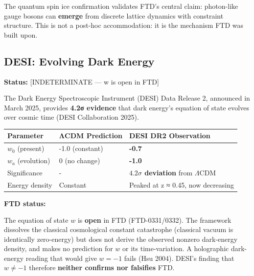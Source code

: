\documentclass[
  11pt,
  letterpaper,
  twoside,
  openany]{book}
\makeatletter
\let\orig@subsection\subsection
\renewcommand{\subsection}{\needspace{6\baselineskip}\orig@subsection}
\makeatother
\begin{document}
\begin{tcolorbox}[enhanced jigsaw, colbacktitle=quarto-callout-important-color!10!white, titlerule=0mm, bottomtitle=1mm, bottomrule=.15mm, colback=white, arc=.35mm, breakable, toprule=.15mm, title=\textcolor{quarto-callout-important-color}{\faExclamation}\hspace{0.5em}{Validation of Core Mechanism}, rightrule=.15mm, coltitle=black, leftrule=.75mm, colframe=quarto-callout-important-color-frame, toptitle=1mm, opacityback=0, opacitybacktitle=0.6, left=2mm]

The quantum spin ice confirmation validates FTD's central claim:
photon-like gauge bosons can \textbf{emerge} from discrete lattice
dynamics with constraint structure. This is not a post-hoc
accommodation: it is the mechanism FTD was built upon.

\end{tcolorbox}

\subsection{DESI: Evolving Dark Energy}\label{sec-desi-dark-energy}

\textbf{Status:} {[}INDETERMINATE --- w is open in FTD{]}

The Dark Energy Spectroscopic Instrument (DESI) Data Release 2,
announced in March 2025, provides \textbf{4.2σ evidence} that dark
energy's equation of state evolves over cosmic time (DESI Collaboration
2025).

\begin{longtable}[]{@{}lll@{}}
\toprule\noalign{}
Parameter & ΛCDM Prediction & DESI DR2 Observation \\
\midrule\noalign{}
\endhead
\bottomrule\noalign{}
\endlastfoot
\(w_0\) (present) & -1.0 (constant) & \textbf{-0.7} \\
\(w_a\) (evolution) & 0 (no change) & \textbf{-1.0} \\
Significance & - & \textbf{\(4.2\sigma\) deviation} from
\(\Lambda\)CDM \\
Energy density & Constant & Peaked at z ≈ 0.45, now decreasing \\
\end{longtable}

\textbf{FTD status:}

The equation of state \(w\) is \textbf{open} in FTD (FTD-0331/0332). The
framework dissolves the classical cosmological constant catastrophe
(classical vacuum is identically zero-energy) but does not derive the
observed nonzero dark-energy density, and makes no prediction for \(w\)
or its time-variation. A holographic dark-energy reading that would give
\(w = -1\) fails (Hsu 2004). DESI's finding that \(w \neq -1\) therefore
\textbf{neither confirms nor falsifies} FTD.
\end{document}
